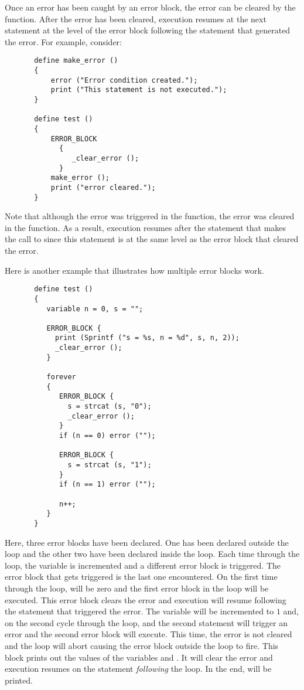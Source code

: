   Once an error has been caught by an error block, the error can be cleared
   by the  function.  After the error has been cleared,
   execution resumes at the next statement at the level of the error block
   following the statement that generated the error.  For example, consider:
\begin{verbatim}
       define make_error ()
       {
           error ("Error condition created.");
           print ("This statement is not executed.");
       }
       
       define test ()
       {
           ERROR_BLOCK 
             {
                _clear_error ();
             }
           make_error ();
           print ("error cleared.");
       }
\end{verbatim}
   Note that although the error was triggered in the  function,
   the error was cleared in the  function.  As a result, execution
   resumes after the statement that makes the call to  since
   this statement is at the same level as the error block that cleared the
   error.
   
   Here is another example that illustrates how multiple error blocks work.
\begin{verbatim}
       define test ()
       {
          variable n = 0, s = "";
          
          ERROR_BLOCK { 
            print (Sprintf ("s = %s, n = %d", s, n, 2));
            _clear_error (); 
          }
          
          forever
          {
             ERROR_BLOCK {
               s = strcat (s, "0");
               _clear_error ();
             }
             if (n == 0) error ("");
             
             ERROR_BLOCK {
               s = strcat (s, "1");
             }
             if (n == 1) error ("");
             
             n++;
          }
       }     
\end{verbatim}
   Here, three error blocks have been declared.  One has been declared
   outside the  loop and the other two have been declared
   inside the  loop.  Each time through the loop, the variable
    is incremented and a different error block is triggered.  The
   error block that gets triggered is the last one encountered.  On the
   first time through the loop,  will be zero and the first error
   block in the loop will be executed.  This error block clears the error
   and execution will resume following the  statement that triggered
   the error.  The variable  will be incremented to $1$ and, on the
   second cycle through the loop, and the second  statement will
   trigger an error and the second error block will execute. This time, the
   error is not cleared and the  loop will abort causing the
   error block outside the  loop to fire.  This block prints
   out the values of the variables  and .  It will clear the
   error and execution resumes on the statement {\em following} the
    loop.  In the end,  will be printed.

